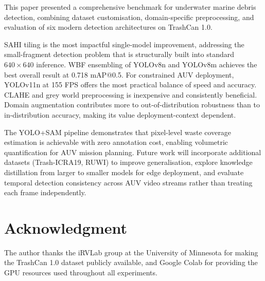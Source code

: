 \documentclass[conference]{IEEEtran}
\begin{document}
This paper presented a comprehensive benchmark for underwater marine debris
detection, combining dataset customisation, domain-specific preprocessing,
and evaluation of six modern detection architectures on TrashCan 1.0.

SAHI tiling is the most impactful single-model improvement, addressing the
small-fragment detection problem that is structurally built into standard
$640 \times 640$ inference. WBF ensembling of YOLOv8n and YOLOv8m achieves
the best overall result at 0.718 mAP@0.5. For constrained AUV deployment,
YOLOv11n at 155 FPS offers the most practical balance of speed and accuracy.
CLAHE and grey world preprocessing is inexpensive and consistently
beneficial. Domain augmentation contributes more to out-of-distribution
robustness than to in-distribution accuracy, making its value
deployment-context dependent.

The YOLO+SAM pipeline demonstrates that pixel-level waste coverage
estimation is achievable with zero annotation cost, enabling volumetric
quantification for AUV mission planning. Future work will incorporate
additional datasets (Trash-ICRA19, RUWI) to improve generalisation,
explore knowledge distillation from larger to smaller models for edge
deployment, and evaluate temporal detection consistency across AUV video
streams rather than treating each frame independently.

\section*{Acknowledgment}

The author thanks the iRVLab group at the University of Minnesota for
making the TrashCan 1.0 dataset publicly available, and Google Colab for
providing the GPU resources used throughout all experiments.

\end{document}
